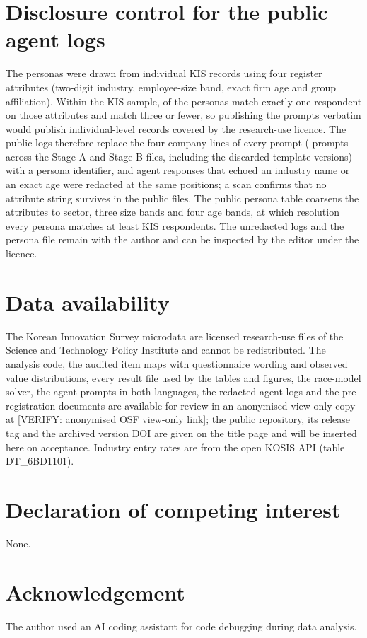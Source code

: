 \documentclass[preprint,12pt,authoryear]{elsarticle}
\newif\ifanon \ifdefined\ANONYMOUS\anontrue\fi
\newcommand{\RepoURL}{https://github.com/jihwanw/escape-or-exit-innovation-race}
\newcommand{\RepoReleaseTag}{v1.0-submission}
\newcommand{\RepoVersionDOI}{[VERIFY: Zenodo version DOI after the archive release]}
\newcommand{\OSFReviewCopyURL}{[VERIFY: anonymised OSF view-only link]}
\begin{document}
\section{Disclosure control for the public agent logs}
\label{app:disclosure}

The personas were drawn from individual KIS records using four register attributes (two-digit industry, employee-size band, exact firm age and group affiliation). Within the KIS sample, \PersonasUniqueInKIS{} of the \StageAPersonas{} personas match exactly one respondent on those attributes and \PersonasKLeThree{} match three or fewer, so publishing the prompts verbatim would publish individual-level records covered by the research-use licence. The public logs therefore replace the four company lines of every prompt (\RedactedPrompts{} prompts across the Stage A and Stage B files, including the discarded template versions) with a persona identifier, and \RedactedResponses{} agent responses that echoed an industry name or an exact age were redacted at the same positions; a scan confirms that no attribute string survives in the public files. The public persona table coarsens the attributes to sector, three size bands and four age bands, at which resolution every persona matches at least \PublicPersonaMinK{} KIS respondents. The unredacted logs and the persona file remain with the author and can be inspected by the editor under the licence.

\section*{Data availability}

The Korean Innovation Survey microdata are licensed research-use files of the Science and Technology Policy Institute and cannot be redistributed. The analysis code, the audited item maps with questionnaire wording and observed value distributions, every result file used by the tables and figures, the race-model solver, the agent prompts in both languages, the redacted agent logs and the pre-registration documents \ifanon are available for review in an anonymised view-only copy at \url{\OSFReviewCopyURL}; the public repository, its release tag and the archived version DOI are given on the title page and will be inserted here on acceptance.\else are available in the project repository (\url{\RepoURL}, release \RepoReleaseTag; archived at Zenodo under version DOI \RepoVersionDOI) and in the Open Science Framework project (\url{\OSFProjectURL}); the pre-registration is at \url{\OSFRegistrationURL} (embargoed until \OSFEmbargoEnd; view-only link available to editors and referees).\fi{} Industry entry rates are from the open KOSIS API (table DT\_6BD1101).

\section*{Declaration of competing interest}

None.

\section*{Acknowledgement}

The author used an AI coding assistant for code debugging during data analysis.



\end{document}
